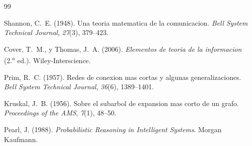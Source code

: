 \documentclass[12pt, a4paper]{article}
\begin{document}
\begin{thebibliography}{99}

Shannon, C.~E. (1948).
Una teoria matematica de la comunicacion.
\textit{Bell System Technical Journal}, \textit{27}(3), 379--423.

Cover, T.~M., y Thomas, J.~A. (2006).
\textit{Elementos de teoria de la informacion} (2.\textsuperscript{a} ed.).
Wiley-Interscience.

Prim, R.~C. (1957).
Redes de conexion mas cortas y algunas generalizaciones.
\textit{Bell System Technical Journal}, \textit{36}(6), 1389--1401.

Kruskal, J.~B. (1956).
Sobre el subarbol de expansion mas corto de un grafo.
\textit{Proceedings of the AMS}, \textit{7}(1), 48--50.

Pearl, J. (1988).
\textit{Probabilistic Reasoning in Intelligent Systems}.
Morgan Kaufmann.

\end{thebibliography}

\end{document}
